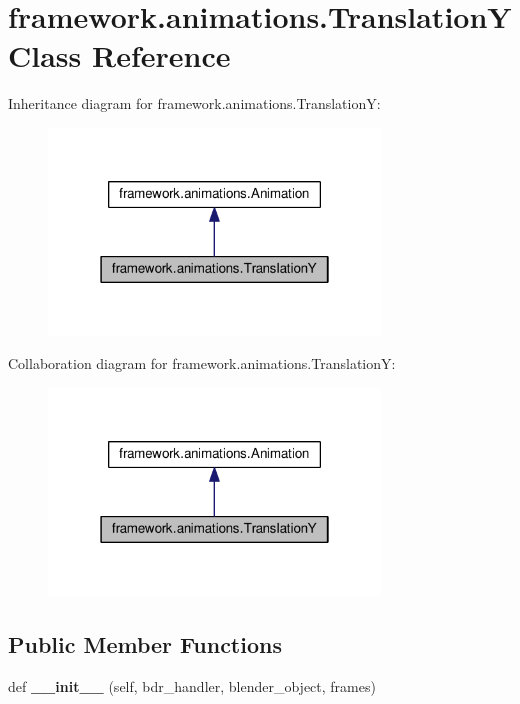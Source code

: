 \hypertarget{classframework_1_1animations_1_1TranslationY}{}\section{framework.\+animations.\+TranslationY Class Reference}
\label{classframework_1_1animations_1_1TranslationY}


Inheritance diagram for framework.\+animations.\+TranslationY\+:
\nopagebreak
\begin{figure}[H]
\begin{center}
\leavevmode
\includegraphics[width=250pt]{classframework_1_1animations_1_1TranslationY__inherit__graph}
\end{center}
\end{figure}


Collaboration diagram for framework.\+animations.\+TranslationY\+:
\nopagebreak
\begin{figure}[H]
\begin{center}
\leavevmode
\includegraphics[width=250pt]{classframework_1_1animations_1_1TranslationY__coll__graph}
\end{center}
\end{figure}
\subsection*{Public Member Functions}
\begin{DoxyCompactItemize}
\item 
def {\bfseries \+\_\+\+\_\+init\+\_\+\+\_\+} (self, bdr\+\_\+handler, blender\+\_\+object, frames)\hypertarget{classframework_1_1animations_1_1TranslationY_a17b43b4fcbff26dff84370849d650287}{}\label{classframework_1_1animations_1_1TranslationY_a17b43b4fcbff26dff84370849d650287}

\end{DoxyCompactItemize}
